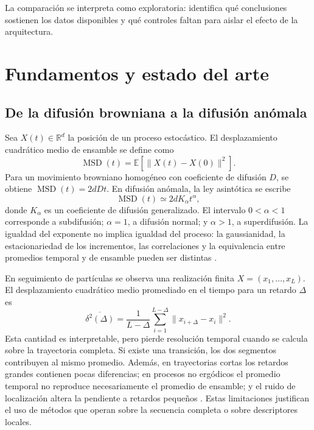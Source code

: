 \documentclass[a4paper,12pt]{article}
\newcommand{\E}{\mathbb{E}}
\begin{document}
La comparación se interpreta como exploratoria: identifica qué conclusiones sostienen los datos disponibles y qué controles faltan para aislar el efecto de la arquitectura.

\section{Fundamentos y estado del arte}

\subsection{De la difusión browniana a la difusión anómala}

Sea $X(t)\in\mathbb{R}^{d}$ la posición de un proceso estocástico. El desplazamiento cuadrático medio de ensamble se define como
\begin{equation}
  \operatorname{MSD}(t)=\E\!\left[\lVert X(t)-X(0)\rVert^2\right].
  \label{eq:msd}
\end{equation}
Para un movimiento browniano homogéneo con coeficiente de difusión $D$, se obtiene $\operatorname{MSD}(t)=2dDt$. En difusión anómala, la ley asintótica se escribe
\begin{equation}
  \operatorname{MSD}(t)\simeq 2dK_{\alpha}t^{\alpha},
  \label{eq:anomalous-msd}
\end{equation}
donde $K_{\alpha}$ es un coeficiente de difusión generalizado. El intervalo $0<\alpha<1$ corresponde a subdifusión; $\alpha=1$, a difusión normal; y $\alpha>1$, a superdifusión. La igualdad del exponente no implica igualdad del proceso: la gaussianidad, la estacionariedad de los incrementos, las correlaciones y la equivalencia entre promedios temporal y de ensamble pueden ser distintas \cite{metzler2000random,metzler2014anomalous}.

En seguimiento de partículas se observa una realización finita $X=(x_1,\ldots,x_L)$. El desplazamiento cuadrático medio promediado en el tiempo para un retardo $\Delta$ es
\begin{equation}
  \overline{\delta^2(\Delta)}=
  \frac{1}{L-\Delta}\sum_{i=1}^{L-\Delta}
  \lVert x_{i+\Delta}-x_i\rVert^2.
  \label{eq:tamsd}
\end{equation}
Esta cantidad es interpretable, pero pierde resolución temporal cuando se calcula sobre la trayectoria completa. Si existe una transición, los dos segmentos contribuyen al mismo promedio. Además, en trayectorias cortas los retardos grandes contienen pocas diferencias; en procesos no ergódicos el promedio temporal no reproduce necesariamente el promedio de ensamble; y el ruido de localización altera la pendiente a retardos pequeños \cite{metzler2014anomalous,manzo2015review}. Estas limitaciones justifican el uso de métodos que operan sobre la secuencia completa o sobre descriptores locales.
\end{document}
